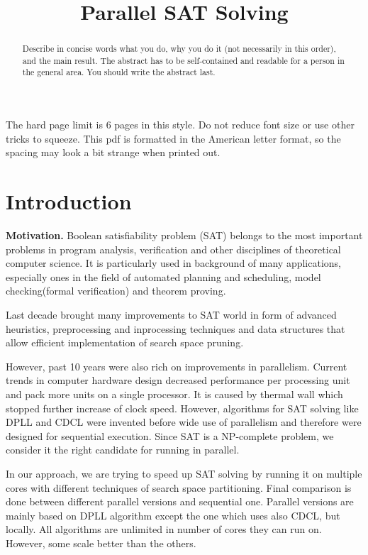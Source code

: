 \documentclass[letterpaper]{article}
\title{Parallel SAT Solving}
\newcommand{\mypar}[1]{{\bf #1.}}
\begin{document}
%
\maketitle
%

The hard page limit is 6 pages in this style. Do not reduce font size
or use other tricks to squeeze. This pdf is formatted in the American letter format, so the spacing may look a bit strange when printed out.

\begin{abstract}
Describe in concise words what you do, why you do it (not necessarily
in this order), and the main result.  The abstract has to be
self-contained and readable for a person in the general area. You
should write the abstract last.
\end{abstract}

\section{Introduction}\label{sec:intro}

\mypar{Motivation} Boolean satisfiability problem (SAT) belongs to the most important problems in program analysis, verification and other disciplines of theoretical computer science. It is particularly used in background of many applications, especially ones in the field of automated planning and scheduling, model checking(formal verification) and theorem proving. 

Last decade brought many improvements to SAT world in form of advanced heuristics, preprocessing and inprocessing techniques and data structures that allow efficient implementation of search space pruning. 

However, past 10 years were also rich on improvements in parallelism. Current trends in computer hardware design decreased performance per processing unit and pack more units on a single processor. It is caused by thermal wall which stopped further increase of clock speed. However, algorithms for SAT solving like DPLL and CDCL were invented before wide use of parallelism and therefore were designed for sequential execution. Since SAT is a NP-complete problem, we consider it the right candidate for running in parallel.

In our approach, we are trying to speed up SAT solving by running it on multiple cores with different techniques of search space partitioning. Final comparison is done between different parallel versions and sequential one. Parallel versions are mainly based on DPLL algorithm except the one which uses also CDCL, but locally. All algorithms are unlimited in number of cores they can run on. However, some scale better than the others. 
\end{document}
